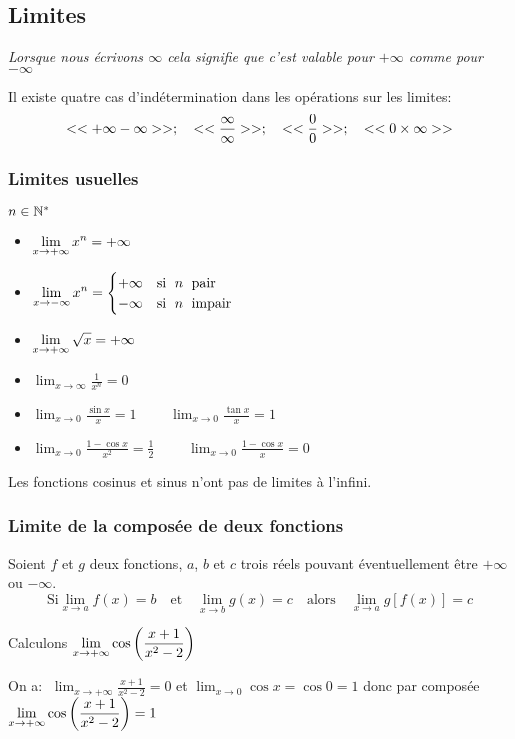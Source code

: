 
\everymath{\displaystyle}



\subsection{Limites}


\textsl{Lorsque nous écrivons $ \infty $ cela signifie que c'est valable pour $ +\infty$ comme pour $-\infty $ }

 Il existe quatre cas d'indétermination dans les opérations sur les limites:
\[ <<+\infty -\infty>>;\quad <<\frac{\infty}{\infty}>>;\quad << \frac{0}{0}>>;\quad <<0\times \infty >> \]
\subsubsection*{Limites usuelles}
 $ n\in\mathbb{N}^* $
\begin{itemize}
\item $ \displaystyle\lim_{x \to +\infty}x^{n}= +\infty$ 
\item $\displaystyle\lim_{x \to -\infty}x^{n}= \begin{cases}
+\infty & \text{si $\; n\;$ pair} \\
-\infty & \text{si $\;n \;$ impair}
\end{cases}$ 
\item $\displaystyle \lim_{x \to +\infty}\sqrt{x}=+\infty$ 
\item $\displaystyle \lim_{x \to \infty} \frac{1}{x^{n}}=0$ 
\item $\displaystyle \lim_{x \to 0}\frac{\sin x}{x}=1$  $\qquad \displaystyle \lim_{x \to 0}\frac{\tan x}{x}=1$ 
\item $ \displaystyle\lim_{x \to 0}\frac{1-\cos x}{x^{2}}= \frac{1}{2}$ $\qquad  \displaystyle\lim_{x \to 0}\frac{1-\cos x}{x}= 0$ 

\end{itemize}
\begin{remark}
Les fonctions cosinus et sinus n'ont pas de limites à l'infini.
\end{remark}
\subsubsection*{Limite de la composée de deux fonctions}
\begin{property}
 Soient $f $  et $g$ deux fonctions, $a $, $b$  et  $c$ trois réels pouvant éventuellement être $ +\infty $ ou $ -\infty $. 
\[\text{Si}\displaystyle \lim_{x \to a} f(x) = b \quad \text{et} \quad \displaystyle \lim_{x \to b} g(x) = c \quad \text{alors} \quad \displaystyle \lim_{x \to a} g[f(x)] = c \]
  \end{property}
\begin{example}
 Calculons $\displaystyle \lim_{x \to +\infty} \cos\left(\frac{x+1}{x^{2}-2}\right)$ 
 
On a: $\; \displaystyle \lim_{x \to +\infty} \frac{x+1}{x^{2}-2} = 0 $ et $ \displaystyle \lim_{x \to 0} \cos x = \cos0=1 $ donc  par composée $  \displaystyle\lim_{x \to +\infty}\cos\left(\frac{x+1}{x^{2}-2}\right)=1 $

\end{example}  

